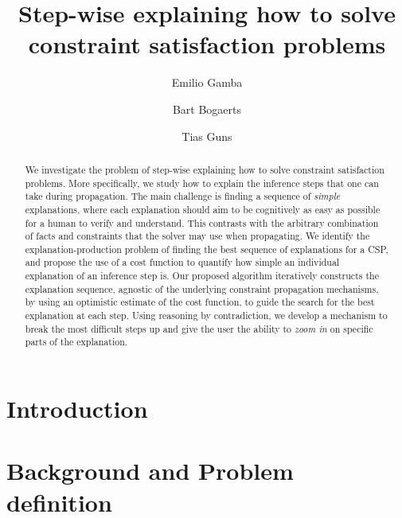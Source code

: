 \documentclass{llncs}
\begin{document}
%
\title{Step-wise explaining how to solve constraint satisfaction problems}
%
\author{Emilio Gamba \and
Bart Bogaerts \and
Tias Guns}

%
\maketitle

\begin{abstract}
We investigate the problem of step-wise explaining how to solve constraint satisfaction problems.
More specifically, we study how to explain the inference steps that one can take during propagation.
The main challenge is finding a sequence of \textit{simple} explanations, where each explanation should aim to be cognitively as easy as possible for a human to verify and understand.
This contrasts with the arbitrary combination of facts and constraints that the solver may use  when propagating.
We identify the explanation-production problem of finding the best sequence of explanations for a CSP, and propose the use of a cost function to quantify how simple an individual explanation of an inference step is.
Our proposed algorithm iteratively constructs the explanation sequence, agnostic of the underlying constraint propagation mechanisms, by using an optimistic estimate of the cost function, to guide the search for the best explanation at each step.
Using reasoning by contradiction, we develop a mechanism to break the most difficult steps up and give the user the ability to \emph{zoom in} on specific parts of the explanation.
\end{abstract}
%
%
\section{Introduction}\label{sec:intro}

\section{Background and Problem definition}\label{sec:background}

\end{document}
